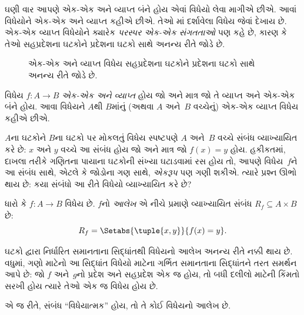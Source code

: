 \begin{explain}
ઘણી વાર આપણે એક-એક અને વ્યાપ્ત બંને
હોય એવાં વિધેયો લેવા માગીએ છીએ. આવાં વિધેયોને
એક-એક અને વ્યાપ્ત કહીએ છીએ. તેઓ
માં દર્શાવેલા વિધેય જેવાં દેખાય છે.
એક-એક વ્યાપ્ત વિધેયોને ક્યારેક \emph{પરસ્પર એક-એક સંગતતાઓ}
પણ કહે છે, કારણ કે તેઓ સહપ્રદેશના ઘટકોને પ્રદેશના
ઘટકો સાથે અનન્ય રીતે જોડે છે.
\begin{figure}
  \caption{એક-એક અને વ્યાપ્ત વિધેય સહપ્રદેશના ઘટકોને
    પ્રદેશના ઘટકો સાથે અનન્ય રીતે જોડે છે.}
\end{figure}
\end{explain}

\begin{defn}[એક-એક વ્યાપ્ત વિધેય]
વિધેય $f \colon A \to B$ \emph{એક-એક અને વ્યાપ્ત} હોય
જો અને માત્ર જો તે વ્યાપ્ત અને એક-એક
બંને હોય. આવા વિધેયને $A$થી $B$માંનું
(અથવા $A$ અને~$B$ વચ્ચેનું) એક-એક વ્યાપ્ત વિધેય કહીએ છીએ.
\end{defn}
\endgroup


\begingroup
\makeatletter{}\makeatother


\label{guunit:OLP-0023}


\begin{explain}
$A$ના ઘટકોને $B$ના ઘટકો પર મોકલતું
વિધેય સ્પષ્ટપણે $A$ અને~$B$ વચ્ચે સંબંધ વ્યાખ્યાયિત
કરે છે: $x$ અને $y$ વચ્ચે આ સંબંધ હોય જો અને માત્ર જો
$f(x) = y$ હોય. હકીકતમાં, દાખલા તરીકે ગણિતના પાયાના
ઘટકોની સંખ્યા ઘટાડવામાં રસ હોય તો, આપણે વિધેય~$f$ને
આ સંબંધ સાથે, એટલે કે જોડોના ગણ સાથે, \emph{એકરૂપ}
પણ ગણી શકીએ. ત્યારે પ્રશ્ન ઊભો થાય છે: કયા સંબંધો
આ રીતે વિધેયો વ્યાખ્યાયિત કરે છે?
\end{explain}

\begin{defn}[વિધેયનો આલેખ] ધારો કે $f\colon A \to B$
વિધેય છે. $f$નો \emph{આલેખ} એ નીચે પ્રમાણે વ્યાખ્યાયિત
સંબંધ $R_f \subseteq A \times B$ છે:
\[
R_f = \Setabs{\tuple{x,y}}{f(x) = y}.
\]
\end{defn}

\begin{explain}
ઘટકો દ્વારા નિર્ધારિત સમાનતાના સિદ્ધાંતથી વિધેયનો
આલેખ અનન્ય રીતે નક્કી થાય છે. વધુમાં, ગણો માટેનો
આ સિદ્ધાંત વિધેયો માટેના ગર્ભિત સમાનતાના સિદ્ધાંતને
તરત સમર્થન આપે છે: જો $f$ અને~$g$નો પ્રદેશ અને
સહપ્રદેશ એક જ હોય, તો બધી દલીલો માટેની કિંમતો
સરખી હોય ત્યારે તેઓ એક જ વિધેય હોય છે.

એ જ રીતે, સંબંધ “વિધેયાત્મક” હોય, તો તે કોઈ
વિધેયનો આલેખ છે.
\end{explain}

